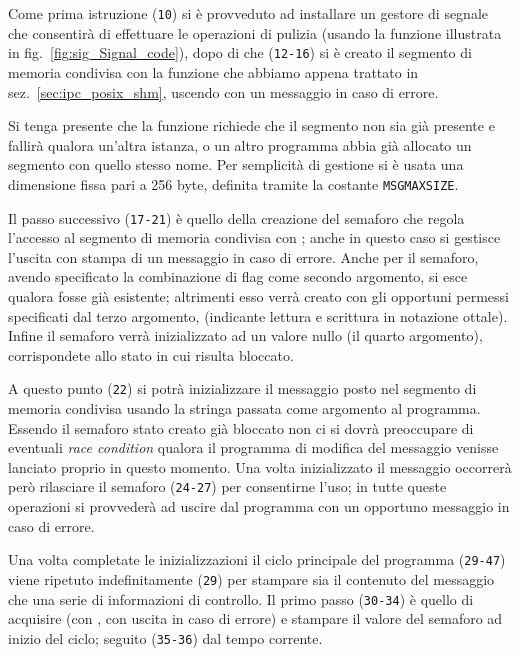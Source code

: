 Come prima istruzione (\texttt{\small 10}) si è provveduto ad installare un
gestore di segnale che consentirà di effettuare le operazioni di pulizia
(usando la funzione  illustrata in
fig.~\ref{fig:sig_Signal_code}), dopo di che (\texttt{\small 12-16}) si è
creato il segmento di memoria condivisa con la funzione  che
abbiamo appena trattato in sez.~\ref{sec:ipc_posix_shm}, uscendo con un
messaggio in caso di errore. 

Si tenga presente che la funzione  richiede che il segmento
non sia già presente e fallirà qualora un'altra istanza, o un altro programma
abbia già allocato un segmento con quello stesso nome. Per semplicità di
gestione si è usata una dimensione fissa pari a 256 byte, definita tramite la
costante \texttt{MSGMAXSIZE}.

Il passo successivo (\texttt{\small 17-21}) è quello della creazione del
semaforo che regola l'accesso al segmento di memoria condivisa con
; anche in questo caso si gestisce l'uscita con stampa di un
messaggio in caso di errore. Anche per il semaforo, avendo specificato la
combinazione di flag  come secondo argomento, si esce
qualora fosse già esistente; altrimenti esso verrà creato con gli opportuni
permessi specificati dal terzo argomento, (indicante lettura e scrittura in
notazione ottale). Infine il semaforo verrà inizializzato ad un valore nullo
(il quarto argomento), corrispondete allo stato in cui risulta bloccato.

A questo punto (\texttt{\small 22}) si potrà inizializzare il messaggio posto
nel segmento di memoria condivisa usando la stringa passata come argomento al
programma. Essendo il semaforo stato creato già bloccato non ci si dovrà
preoccupare di eventuali \textit{race condition} qualora il programma di
modifica del messaggio venisse lanciato proprio in questo momento.  Una volta
inizializzato il messaggio occorrerà però rilasciare il semaforo
(\texttt{\small 24-27}) per consentirne l'uso; in tutte queste operazioni si
provvederà ad uscire dal programma con un opportuno messaggio in caso di
errore.

Una volta completate le inizializzazioni il ciclo principale del programma
(\texttt{\small 29-47}) viene ripetuto indefinitamente (\texttt{\small 29})
per stampare sia il contenuto del messaggio che una serie di informazioni di
controllo. Il primo passo (\texttt{\small 30-34}) è quello di acquisire (con
, con uscita in caso di errore) e stampare il valore del
semaforo ad inizio del ciclo; seguito (\texttt{\small 35-36}) dal tempo
corrente.


